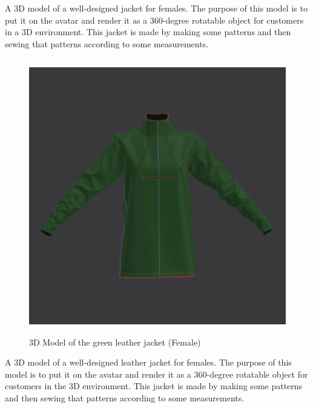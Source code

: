 A 3D model of a well-designed jacket for females. The purpose of this model is to put it on the avatar and render it as a 360-degree rotatable object for customers in a 3D environment. This jacket is made by making some patterns and then sewing that patterns according to some measurements.
\begin{figure}[H]
    \centering
    \includegraphics[width=13cm,height=12cm]{Figures/3DJackets/female3.png}
    \caption{3D Model of the green leather jacket (Female)}
    \label{3D Model of the green leather jacket (Female)}
   
\end{figure}
A 3D model of a well-designed leather jacket for females. The purpose of this model is to put it on the avatar and render it as a 360-degree rotatable object for customers in the 3D environment. This jacket is made by making some patterns and then sewing that patterns according to some measurements.
